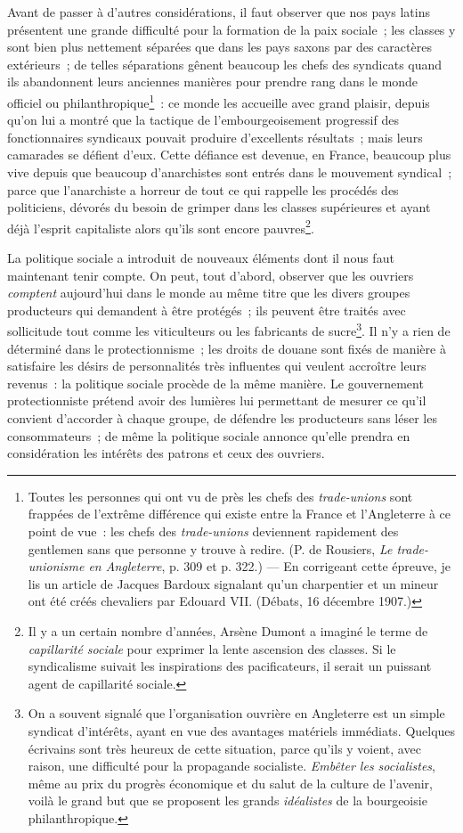 \documentclass[french,twoside]{book} %
\begin{document}
\noindent Avant de passer à d’autres considérations, il faut observer que nos pays latins présentent une grande difficulté pour la formation de la paix sociale ; les classes y sont bien plus nettement séparées que dans les pays saxons par des caractères extérieurs ; de telles séparations gênent beaucoup les chefs des syndicats quand ils abandonnent leurs anciennes manières pour prendre rang dans le monde officiel ou philanthropique\footnote{ \noindent Toutes les personnes qui ont vu de près les chefs des \emph{trade-unions} sont frappées de l’extrême différence qui existe entre la France et l’Angleterre à ce point de vue : les chefs des \emph{trade-unions} deviennent rapidement des gentlemen sans que personne y trouve à redire. (P. de Rousiers, \emph{Le trade-unionisme en Angleterre}, p. 309 et p. 322.) — En corrigeant cette épreuve, je lis un article de Jacques Bardoux signalant qu’un charpentier et un mineur ont été créés chevaliers par Edouard VII. (Débats, 16 décembre 1907.)
 } : ce monde les  accueille avec grand plaisir, depuis qu’on lui a montré que la tactique de l’embourgeoisement progressif des fonctionnaires syndicaux pouvait produire d’excellents résultats ; mais leurs camarades se défient d’eux. Cette défiance est devenue, en France, beaucoup plus vive depuis que beaucoup d’anarchistes sont entrés dans le mouvement syndical ; parce que l’anarchiste a horreur de tout ce qui rappelle les procédés des politiciens, dévorés du besoin de grimper dans les classes supérieures et ayant déjà l’esprit capitaliste alors qu’ils sont encore pauvres\footnote{ \noindent Il y a un certain nombre d’années, Arsène Dumont a imaginé le terme de \emph{capillarité sociale} pour exprimer la lente ascension des classes. Si le syndicalisme suivait les inspirations des pacificateurs, il serait un puissant agent de capillarité sociale.
 }.\par
La politique sociale a introduit de nouveaux éléments dont il nous faut maintenant tenir compte. On peut, tout d’abord, observer que les ouvriers \emph{comptent} aujourd’hui dans le monde au même titre que les divers groupes producteurs qui demandent à être protégés ; ils peuvent être traités avec sollicitude tout comme les viticulteurs ou les fabricants de sucre\footnote{ \noindent On a souvent signalé que l’organisation ouvrière en Angleterre est un simple syndicat d’intérêts, ayant en vue des avantages matériels immédiats. Quelques écrivains sont très heureux de cette situation, parce qu’ils y voient, avec raison, une difficulté pour la propagande socialiste. \emph{Embêter les socialistes}, même au prix du progrès économique et du salut de la culture de l’avenir, voilà le grand but que se proposent les grands \emph{idéalistes} de la bourgeoisie philanthropique.
 }. Il n’y a rien  de déterminé dans le protectionnisme ; les droits de douane sont fixés de manière à satisfaire les désirs de personnalités très influentes qui veulent accroître leurs revenus : la politique sociale procède de la même manière. Le gouvernement protectionniste prétend avoir des lumières lui permettant de mesurer ce qu’il convient d’accorder à chaque groupe, de défendre les producteurs sans léser les consommateurs ; de même la politique sociale annonce qu’elle prendra en considération les intérêts des patrons et ceux des ouvriers.\par
\end{document}
